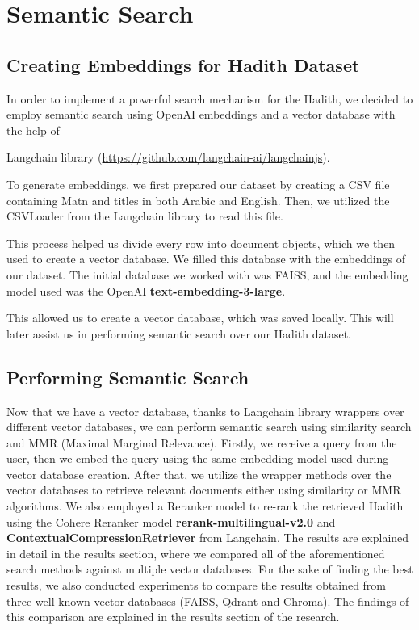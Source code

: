 \documentclass{svproc}
\begin{document}
\section{Semantic Search}

\subsection{Creating Embeddings for Hadith Dataset}

In order to implement a powerful search mechanism for the Hadith, we decided to employ semantic search using OpenAI embeddings and a vector database with the help of

 Langchain library (\url{https://github.com/langchain-ai/langchainjs}).

To generate embeddings, we first prepared our dataset by creating a CSV file containing Matn and titles in both Arabic and English. Then, we utilized the CSVLoader from the Langchain library to read this file.

This process helped us divide every row into document objects, which we then used to create a vector database. We filled this database with the embeddings of our dataset. The initial database we worked with was FAISS, and the embedding model used was the OpenAI \textbf{text-embedding-3-large}.

This allowed us to create a vector database, which was saved locally. This will later assist us in performing semantic search over our Hadith dataset.

\subsection{Performing Semantic Search}

Now that we have a vector database, thanks to Langchain library wrappers over different vector databases, we can perform semantic search using similarity search and MMR (Maximal Marginal Relevance). Firstly, we receive a query from the user, then we embed the query using the same embedding model used during vector database creation. After that, we utilize the wrapper methods over the vector databases to retrieve relevant documents either using similarity or MMR algorithms. We also employed a Reranker model to re-rank the retrieved Hadith using the Cohere Reranker model \textbf{rerank-multilingual-v2.0} and \textbf{ContextualCompressionRetriever} from Langchain. The results are explained in detail in the results section, where we compared all of the aforementioned search methods against multiple vector databases. For the sake of finding the best results, we also conducted experiments to compare the results obtained from three well-known vector databases (FAISS, Qdrant and Chroma). The findings of this comparison are explained in the results section of the research.
\end{document}
